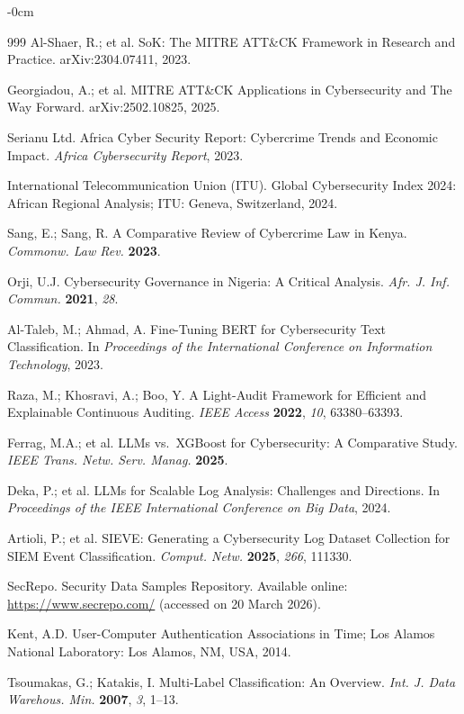 \documentclass[futureinternet,article,submit,pdftex,moreauthors]{Definitions/mdpi}
\begin{document}
\begin{adjustwidth}{-\extralength}{0cm}
\begin{thebibliography}{999}
Al-Shaer, R.; et al. SoK: The MITRE ATT\&CK Framework in Research and Practice.
arXiv:2304.07411, 2023.

Georgiadou, A.; et al. MITRE ATT\&CK Applications in Cybersecurity and The Way Forward.
arXiv:2502.10825, 2025.

Serianu Ltd. Africa Cyber Security Report: Cybercrime Trends and Economic Impact.
\textit{Africa Cybersecurity Report}, 2023.

International Telecommunication Union (ITU). Global Cybersecurity Index 2024: African
Regional Analysis; ITU: Geneva, Switzerland, 2024.

Sang, E.; Sang, R. A Comparative Review of Cybercrime Law in Kenya.
\textit{Commonw. Law Rev.} \textbf{2023}.

Orji, U.J. Cybersecurity Governance in Nigeria: A Critical Analysis.
\textit{Afr. J. Inf. Commun.} \textbf{2021}, \textit{28}.

Al-Taleb, M.; Ahmad, A. Fine-Tuning BERT for Cybersecurity Text Classification.
In \textit{Proceedings of the International Conference on Information Technology}, 2023.

Raza, M.; Khosravi, A.; Boo, Y. A Light-Audit Framework for Efficient and Explainable
Continuous Auditing. \textit{IEEE Access} \textbf{2022}, \textit{10}, 63380--63393.

Ferrag, M.A.; et al. LLMs vs.\ XGBoost for Cybersecurity: A Comparative Study.
\textit{IEEE Trans. Netw. Serv. Manag.} \textbf{2025}.

Deka, P.; et al. LLMs for Scalable Log Analysis: Challenges and Directions.
In \textit{Proceedings of the IEEE International Conference on Big Data}, 2024.

Artioli, P.; et al. SIEVE: Generating a Cybersecurity Log Dataset Collection for SIEM
Event Classification. \textit{Comput. Netw.} \textbf{2025}, \textit{266}, 111330.

SecRepo. Security Data Samples Repository. Available online:
\url{https://www.secrepo.com/} (accessed on 20 March 2026).

Kent, A.D. User-Computer Authentication Associations in Time; Los Alamos National
Laboratory: Los Alamos, NM, USA, 2014.

Tsoumakas, G.; Katakis, I. Multi-Label Classification: An Overview.
\textit{Int. J. Data Warehous. Min.} \textbf{2007}, \textit{3}, 1--13.


\end{thebibliography}
\end{adjustwidth}
\end{document}
